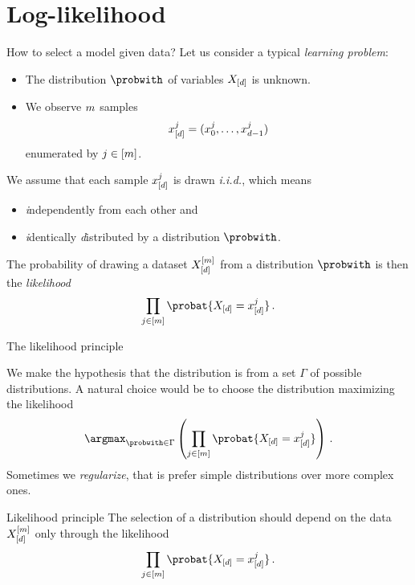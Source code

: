 \documentclass{beamer}
\begin{document}
    {\frame[plain]{\titlepage}}
    \showoutlineatsection


    \section{Log-likelihood}


    \begin{frame}{How to select a model given data?}
        Let us consider a typical \emph{learning problem}:
        \begin{itemize}
            \item The distribution $\probwith$ of variables $X_{[d]}$ is unknown.
            \item We observe $m$ samples
            \begin{align*}
                x_{[d]}^{j} = (x_{0}^{j},\ldots,x_{d-1}^{j})
            \end{align*}
            enumerated by $j\in[m]$.
        \end{itemize}

        We assume that each sample $x_{[d]}^{j}$ is drawn \emph{i.i.d.}, which means
        \begin{itemize}
            \item \emph{i}ndependently from each other and
            \item \emph{i}dentically \emph{d}istributed by a distribution $\probwith$.
        \end{itemize}
        The probability of drawing a dataset $X_{[d]}^{[m]}$ from a distribution $\probwith$ is then the \emph{likelihood}
        \begin{align*}
            \prod_{\datindexin} \probat{\shortcatvariables=\shortcatindices^{\datindex}} \, .
        \end{align*}
    \end{frame}


    \begin{frame}{The likelihood principle}

        We make the hypothesis that the distribution is from a set $\Gamma$ of possible distributions.
        A natural choice would be to choose the distribution maximizing the likelihood
        \begin{align*}
            \argmax_{\probwith\in\Gamma}\left(\prod_{\datindexin} \probat{\shortcatvariables=\shortcatindices^{\datindex}}\right) \, .
        \end{align*}
        Sometimes we \emph{regularize}, that is prefer simple distributions over more complex ones.

        \begin{block}{Likelihood principle}
            The selection of a distribution should depend on the data $X_{[d]}^{[m]}$ only through the likelihood
            \begin{align*}
                \prod_{\datindexin} \probat{\shortcatvariables=\shortcatindices^{\datindex}} \, .
            \end{align*}
        \end{block}
    \end{frame}
\end{document}

